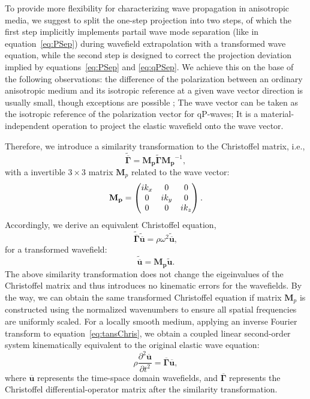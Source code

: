 To provide more flexibility for characterizing wave propagation in anisotropic media, we suggest to split
the one-step projection into two steps, of which the first step
implicitly implements partail wave mode separation (like in equation~\ref{eq:PSep}) during wavefield
extrapolation with a transformed wave equation, while the second step is designed to correct the
projection deviation implied by equations~\ref{eq:PSep} and \ref{eq:qPSep}.
We achieve this on the base of the following observations:
 the difference of the polarization between an ordinary anisotropic medium and its isotropic reference 
at a given wave vector direction is usually
 small, though exceptions are possible \cite[]{thomsen:1986, tsvankin.chesnokov:1990}; The wave vector can be
taken as the isotropic reference of the polarization vector for qP-waves; It is a material-independent
operation to project the elastic wavefield onto the wave vector.

Therefore, we introduce a similarity transformation to the Christoffel matrix, i.e.,
\begin{equation}
\label{eq:tansChrisM}
\widetilde{\overline{\mathbf{\Gamma}}} = \mathbf{M_p}\widetilde{\mathbf{\Gamma}}\mathbf{M_p}^{-1},
\end{equation}
with a invertible $3\times3$ matrix $\mathbf{M}_{p}$ related to the wave vector:
\begin{equation}
\label{eq:tansM}
\mathbf{M_p}=
\begin{pmatrix}i{k_x} & 0 &0 \cr
         0 & i{k_y} &0 \cr
         0 & 0 & i{k_z}\end{pmatrix}.
\end{equation}
Accordingly, we derive an equivalent Christoffel equation,
\begin{equation}
\label{eq:tansChris}
\widetilde{\overline{\mathbf{\Gamma}}}\widetilde{\overline{\mathbf{u}}} = \rho{\omega}^2\widetilde{\overline{\mathbf{u}}},
\end{equation}
for a transformed wavefield:
\begin{equation}
\label{eq:similarT}
\widetilde{\overline{\mathbf{u}}} = \mathbf{M_p}\widetilde{\mathbf{u}}.
\end{equation}
The above similarity transformation does not change the eigeinvalues of the Christoffel matrix and thus 
introduces no kinematic errors for the wavefields. By the way, we can obtain 
the same transformed Christoffel equation if matrix $\mathbf{M}_{p}$ is constructed using the normalized wavenumbers
to ensure all spatial frequencies are uniformly scaled.
For a locally smooth medium, applying an inverse Fourier transform to
equation~\ref{eq:tansChris}, we obtain a coupled
 linear second-order system kinematically equivalent to the original elastic wave equation:
\begin{equation}
\label{eq:tansElastic}
\rho\frac{\partial^2\overline{\mathbf{u}}}{\partial t^2} = \overline{\mathbf{\Gamma}}\overline{\mathbf{u}},
\end{equation}
where $\overline{\mathbf{u}}$ represents the time-space domain wavefields, and $\overline{\mathbf{\Gamma}}$
 represents the Christoffel differential-operator matrix after the similarity transformation.

